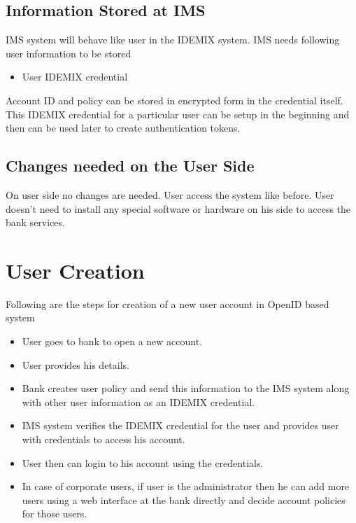 \subsection{Information Stored at IMS}
IMS system will behave like user in the IDEMIX system. IMS needs following user information to be stored
\begin{itemize}
	\item User IDEMIX credential
\end{itemize}
Account ID and policy can be stored in encrypted form in the credential itself. This IDEMIX credential for a particular user can be setup in the beginning and then can be used later to create authentication tokens.
\subsection{Changes needed on the User Side}
On user side no changes are needed. User access the system like before. User doesn't need to install any special software or hardware on his side to access the bank services. 
\section{User Creation}
Following are the steps for creation of a new user account in OpenID based system
\begin{itemize}
	\item User goes to bank to open a new account.
	\item User provides his details.
	\item Bank creates user policy and send this information to the IMS system along with other user information as an IDEMIX credential.
	\item IMS system verifies the IDEMIX credential for the user and provides user with credentials to access his account.
	\item User then can login to his account using the credentials.
	\item In case of corporate users, if user is the administrator then he can add more users using a web interface at the bank directly and decide account policies for those users.
\end{itemize}
